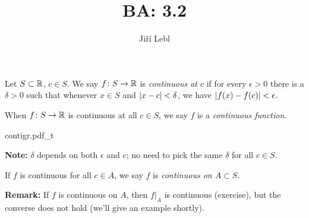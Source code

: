 \documentclass[10pt,aspectratio=149]{beamer}
\author{Ji\v{r}\'i Lebl}
\institute[OSU]{%
Departemento pri Matematiko de Oklahoma {\^S}tata Universitato}
\title{BA: 3.2}
\date{}
\begin{document}
\begin{frame}
\titlepage
\end{frame}

\begin{frame}
\begin{definition}
Let $S \subset {\mathbb{R}}$, $c \in S$.  We say $f \colon S \to {\mathbb{R}}$ is
\emph{continuous at $c$} if for every $\epsilon > 0$
there is a $\delta > 0$ such that whenever $x \in S$ and $\left\lvert {x-c} \right\rvert <
\delta$, we have
$\left\lvert {f(x)-f(c)} \right\rvert < \epsilon$.

\pause

When $f \colon S \to {\mathbb{R}}$ is continuous at all $c \in S$, we say
$f$ is a \emph{continuous function}.
\end{definition}

\pause
\begin{center}
{contigr.pdf_t}
\end{center}

\pause
\textbf{Note:} $\delta$ 
depends on both $\epsilon$ and $c$; no need to pick
the same $\delta$ for all $c \in S$.

\pause
\medskip

If $f$ is continuous for all $c \in A$, we say $f$ is \emph{continuous on $A \subset S$}.

\pause
\medskip

\textbf{Remark:}
If $f$ is continuous on $A$, then $f|_A$ is continuous (exercise),
but the converse does not hold (we'll give an example shortly).

\end{frame}
\end{document}
